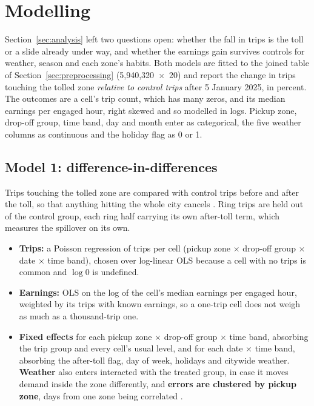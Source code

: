 \documentclass[11pt]{article}
\begin{document}
\section{Modelling}
\label{sec:modelling}
Section~\ref{sec:analysis} left two questions open: whether the fall in trips is the toll or a slide already under way, and whether the earnings gain survives controls for weather, season and each zone's habits. Both models are fitted to the joined table of Section~\ref{sec:preprocessing} (5,940,320~$\times$~20) and report the change in trips touching the tolled zone \emph{relative to control trips} after 5 January 2025, in percent. The outcomes are a cell's trip count, which has many zeros, and its median earnings per engaged hour, right skewed and so modelled in logs. Pickup zone, drop-off group, time band, day and month enter as categorical, the five weather columns as continuous and the holiday flag as 0 or 1.

\subsection{Model 1: difference-in-differences}
Trips touching the tolled zone are compared with control trips before and after the toll, so that anything hitting the whole city cancels \cite{angrist2009}. Ring trips are held out of the control group, each ring half carrying its own after-toll term, which measures the spillover on its own.

\begin{itemize}[leftmargin=*, itemsep=1pt, topsep=2pt]
    \item \textbf{Trips:} a Poisson regression of trips per cell (pickup zone $\times$ drop-off group $\times$ date $\times$ time band), chosen over log-linear OLS because a cell with no trips is common and $\log 0$ is undefined.
    \item \textbf{Earnings:} OLS on the log of the cell's median earnings per engaged hour, weighted by its trips with known earnings, so a one-trip cell does not weigh as much as a thousand-trip one.
    \item \textbf{Fixed effects} for each pickup zone $\times$ drop-off group $\times$ time band, absorbing the trip group and every cell's usual level, and for each date $\times$ time band, absorbing the after-toll flag, day of week, holidays and citywide weather. \textbf{Weather} also enters interacted with the treated group, in case it moves demand inside the zone differently, and \textbf{errors are clustered by pickup zone}, days from one zone being correlated \cite{bertrand2004}.
\end{itemize}
\end{document}
